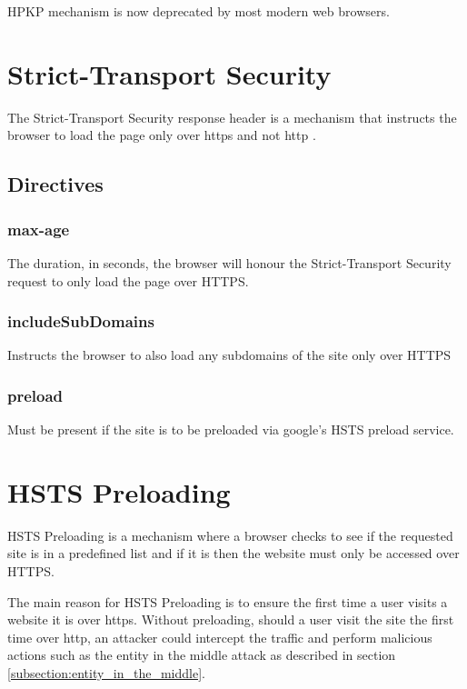 \documentclass{mscreport}
\begin{document}
\vspace{0.3cm} \noindent
HPKP mechanism is now deprecated by most modern web browsers.

\newpage

\section{Strict-Transport Security}
\label{section:hsts}

The Strict-Transport Security response header is a mechanism that instructs the browser to load the page only over https and not http \cite{Hodges2012-pe}.
\subsection{Directives}
\subsubsection{max-age}
The duration, in seconds, the browser will honour the Strict-Transport Security request to only load the page over HTTPS.

\subsubsection{includeSubDomains}
Instructs the browser to also load any subdomains of the site only over HTTPS

\subsubsection{preload}

Must be present if the site is to be preloaded via google's HSTS preload service.

\section{HSTS Preloading}
\label{section:hsts_preload}

HSTS Preloading is a mechanism where a browser checks to see if the requested site is in a predefined list and if it is then the website must only be accessed over HTTPS.

\vspace{0.3cm} \noindent
The main reason for HSTS Preloading is to ensure the first time a user visits a website it is over https. Without preloading, should a user visit the site the first time over http, an attacker could intercept the traffic and perform malicious actions such as the entity in the middle attack as described in section \ref{subsection:entity_in_the_middle}.
\end{document}
